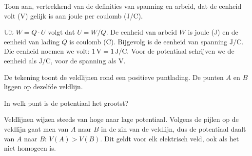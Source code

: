 \documentclass{ximera}
\begin{document}
\begin{question}
    Toon aan, vertrekkend van de definities van spanning en arbeid, dat de eenheid volt (V) gelijk is aan joule per coulomb (J/C).

    \begin{solution}\nl
        Uit $W = Q \cdot U$ volgt dat $U = W/Q$. De eenheid van arbeid $W$ is joule (J) en de eenheid van lading $Q$ is coulomb (C). Bijgevolg is de eenheid van spanning $\mathrm{J/C}$. Die eenheid noemen we volt: $1 \, \mathrm{V} = 1 \, \mathrm{J/C}$. Voor de potentiaal schrijven we de eenheid als $\mathrm{J/C}$, voor de spanning als $\mathrm{V}$.
    \end{solution}
\end{question}

\begin{question}
    De tekening toont de veldlijnen rond een positieve puntlading. De punten $A$ en $B$ liggen op dezelfde veldlijn.

    \begin{center}
    \end{center}

    In welk punt is de potentiaal het grootst?

    \begin{multipleChoice}
    \end{multipleChoice}

    \begin{solution}\nl
        Veldlijnen wijzen steeds van hoge naar lage potentiaal. Volgens de pijlen op de veldlijn gaat men van $A$ naar $B$ in de zin van de veldlijn, dus de potentiaal daalt van $A$ naar $B$: $V(A) > V(B)$. Dit geldt voor elk elektrisch veld, ook als het niet homogeen is.
    \end{solution}
\end{question}
\end{document}
